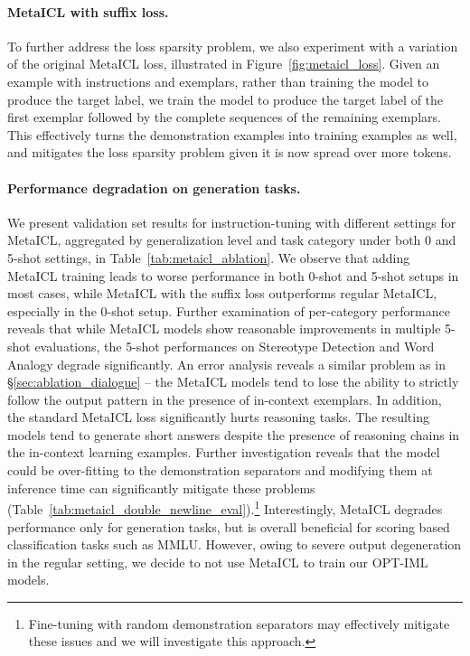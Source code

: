 \paragraph{MetaICL with suffix loss.} To further address the loss sparsity problem, we also experiment with a variation of the original MetaICL loss, illustrated in Figure~\ref{fig:metaicl_loss}. Given an example with instructions and exemplars, rather than training the model to produce the target label, we train the model to produce the target label of the first exemplar followed by the complete sequences of the remaining exemplars. This effectively turns the demonstration examples into training examples as well, and mitigates the loss sparsity problem given it is now spread over more tokens. 

\paragraph{Performance degradation on generation tasks.} We present validation set results for instruction-tuning with different settings for MetaICL, aggregated by generalization level and task category under both 0 and 5-shot settings, in Table~\ref{tab:metaicl_ablation}. We observe that adding MetaICL training leads to worse performance in both 0-shot and 5-shot setups in most cases, while MetaICL with the suffix loss outperforms regular MetaICL, especially in the 0-shot setup. Further examination of per-category performance reveals that while MetaICL models show reasonable improvements in multiple 5-shot evaluations, the 5-shot performances on Stereotype Detection and Word Analogy degrade significantly. An error analysis reveals a similar problem as in  \S\ref{sec:ablation_dialogue} -- the MetaICL models tend to lose the ability to strictly follow the output pattern in the presence of in-context exemplars. In addition, the standard MetaICL loss significantly hurts reasoning tasks. The resulting models tend to generate short answers despite the presence of reasoning chains in the in-context learning examples. Further investigation reveals that the model could be over-fitting to the demonstration separators and modifying them at inference time can significantly mitigate these problems (Table~\ref{tab:metaicl_double_newline_eval}).\footnote{Fine-tuning with random demonstration separators may effectively mitigate these issues and we will investigate this approach.} Interestingly, MetaICL degrades performance only for generation tasks, but is overall beneficial for scoring based classification tasks such as MMLU. However, owing to severe output degeneration in the regular setting, we decide to not use MetaICL to train our OPT-IML models.

